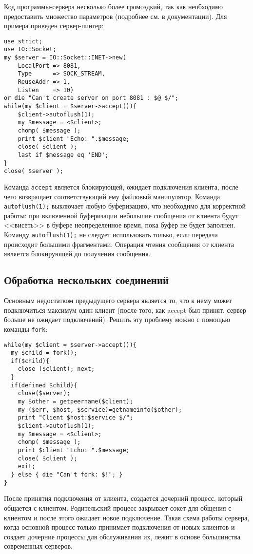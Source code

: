 Код программы-сервера несколько более громоздкий, так как необходимо предоставить множество параметров (подробнее см. в документации). Для примера приведен сервер-пингер:
\begin{verbatim}
use strict;
use IO::Socket;
my $server = IO::Socket::INET->new(
    LocalPort => 8081,
    Type      => SOCK_STREAM,
    ReuseAddr => 1,
    Listen    => 10)
or die "Can't create server on port 8081 : $@ $/";
while(my $client = $server->accept()){
    $client->autoflush(1);
    my $message = <$client>;
    chomp( $message );
    print $client "Echo: ".$message;
    close( $client );
    last if $message eq 'END';
}
close( $server );
\end{verbatim}
Команда \verb|accept| является блокирующей, ожидает подключения клиента, после чего возвращает соответствующий ему файловый манипулятор. Команда \verb|autoflush(1);| выключает любую буферизацию, что необходимо для корректной работы: при включенной буферизации небольшие сообщения от клиента будут <<висеть>> в буфере неопределенное время, пока буфер не будет заполнен. Команду \verb|autoflush(1);| не следует использовать только, если передача происходит большими фрагментами. Операция чтения сообщения от клиента является блокирующей до получения сообщения.


\subsection{Обработка нескольких соединений}
Основным недостатком предыдущего сервера является то, что к нему может подключиться максимум один клиент (после того, как accept был принят, сервер больше не ожидает подключений). Решить эту проблему можно с помощью команды \verb|fork|:
\begin{verbatim}
while(my $client = $server->accept()){
  my $child = fork();
  if($child){
    close ($client); next;
  }
  if(defined $child){
    close($server);
    my $other = getpeername($client);
    my ($err, $host, $service)=getnameinfo($other);
    print "Client $host:$service $/";
    $client->autoflush(1);
    my $message = <$client>;
    chomp( $message );
    print $client "Echo: ".$message;
    close( $client );
    exit;
  } else { die "Can't fork: $!"; }
}
\end{verbatim}
После принятия подключения от клиента, создается дочерний процесс, который общается с клиентом. Родительский процесс закрывает сокет для общения с клиентом и после этого ожидает новое подключение. Такая схема работы сервера, когда основной процесс только принимает подключения от новых клиентов и создает дочерние процессы для обслуживания их, лежит в основе большинства современных серверов.

